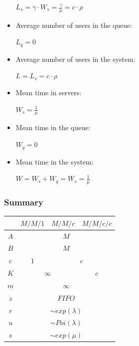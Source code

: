 \documentclass[../main.tex]{subfiles}
\begin{document}
\begin{itemize}
{		$
			L_s = \gamma \cdot W_s = \frac {\gamma} {\mu} = c \cdot \rho
		$
	}
	\item {
		Average number of users in the queue:

		$
			L_q = 0
		$
	}
	\item {
		Average number of users in the system:

		$
			L = L_s = c \cdot \rho
		$
	}
	\item {
		Mean time in servers:

		$
			W_s = \frac {1} {\mu}
		$
	}
	\item {
		Mean time in the queue:

		$
			W_q = 0
		$
	}
	\item {
		Mean time in the system:

		$
			W =
			W_s + W_q =
			W_s =
			\frac {1} {\mu}
		$
	}
\end{itemize}

\subsubsection{Summary}

\begin{tabular}{|c|c|c|c|}
	\hline
	& $M/M/1$ & $M/M/c$ & $M/M/c/c$ \\
	\hline
	$A$ & \multicolumn{3}{c|}{$M$} \\
	\hline
	$B$ & \multicolumn{3}{c|}{$M$} \\
	\hline
	$c$ & $1$ & \multicolumn{2}{c|}{$c$} \\
	\hline
	$K$ & \multicolumn{2}{c|}{$\infty$} & $c$ \\
	\hline
	$m$ & \multicolumn{3}{c|}{$\infty$} \\
	\hline
	$z$ & \multicolumn{3}{c|}{$FIFO$} \\
	\hline
	$r$ & \multicolumn{3}{c|}{$\sim exp(\lambda)$} \\
	\hline
	$u$ & \multicolumn{3}{c|}{$\sim Poi(\lambda)$} \\
	\hline
	$s$ & \multicolumn{3}{c|}{$\sim exp(\mu)$} \\
	\hline
\end{tabular}
\end{document}
